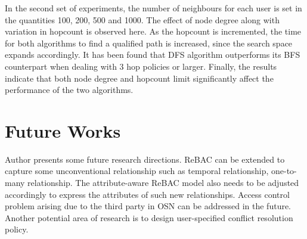 \documentclass[10pt, conference, compsocconf]{IEEEtran}
\begin{document}
In the second set of experiments, the number of neighbours for each user is set in the quantities 100, 200, 500 and 1000. The effect of node degree along with variation in hopcount is observed here. As the hopcount is incremented, the time for both algorithms to find a qualified path is increased, since the search space expands accordingly. It has been found that DFS algorithm outperforms its BFS counterpart when dealing with 3 hop policies or larger. Finally, the results indicate that both node degree and hopcount limit significantly affect the performance of the two algorithms.

\section{Future Works}
Author presents some future research directions. ReBAC can be extended to capture some unconventional relationship such as temporal relationship, one-to-many relationship. The attribute-aware ReBAC model also needs to be adjusted accordingly to express the attributes of such new relationships. Access control problem arising due to the third  party in OSN can be addressed in the future. Another potential area of research is to design user-specified conflict resolution policy.


%
\IEEEpeerreviewmaketitle


%
%
%
%


%
%
\end{document}
